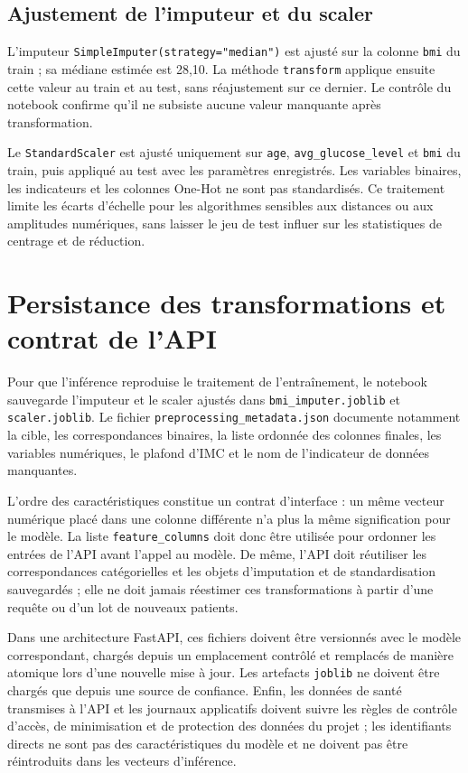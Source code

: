\subsection{Ajustement de l'imputeur et du scaler}
L'imputeur \texttt{SimpleImputer(strategy="median")} est ajusté sur la colonne \texttt{bmi} du train ; sa médiane estimée est 28,10. La méthode \texttt{transform} applique ensuite cette valeur au train et au test, sans réajustement sur ce dernier. Le contrôle du notebook confirme qu'il ne subsiste aucune valeur manquante après transformation.

Le \texttt{StandardScaler} est ajusté uniquement sur \texttt{age}, \texttt{avg\_glucose\_level} et \texttt{bmi} du train, puis appliqué au test avec les paramètres enregistrés. Les variables binaires, les indicateurs et les colonnes One-Hot ne sont pas standardisés. Ce traitement limite les écarts d'échelle pour les algorithmes sensibles aux distances ou aux amplitudes numériques, sans laisser le jeu de test influer sur les statistiques de centrage et de réduction.

\section{Persistance des transformations et contrat de l'API}
Pour que l'inférence reproduise le traitement de l'entraînement, le notebook sauvegarde l'imputeur et le scaler ajustés dans \texttt{bmi\_imputer.joblib} et \texttt{scaler.joblib}. Le fichier \texttt{preprocessing\_metadata.json} documente notamment la cible, les correspondances binaires, la liste ordonnée des colonnes finales, les variables numériques, le plafond d'IMC et le nom de l'indicateur de données manquantes.

L'ordre des caractéristiques constitue un contrat d'interface : un même vecteur numérique placé dans une colonne différente n'a plus la même signification pour le modèle. La liste \texttt{feature\_columns} doit donc être utilisée pour ordonner les entrées de l'API avant l'appel au modèle. De même, l'API doit réutiliser les correspondances catégorielles et les objets d'imputation et de standardisation sauvegardés ; elle ne doit jamais réestimer ces transformations à partir d'une requête ou d'un lot de nouveaux patients.

Dans une architecture FastAPI, ces fichiers doivent être versionnés avec le modèle correspondant, chargés depuis un emplacement contrôlé et remplacés de manière atomique lors d'une nouvelle mise à jour. Les artefacts \texttt{joblib} ne doivent être chargés que depuis une source de confiance. Enfin, les données de santé transmises à l'API et les journaux applicatifs doivent suivre les règles de contrôle d'accès, de minimisation et de protection des données du projet ; les identifiants directs ne sont pas des caractéristiques du modèle et ne doivent pas être réintroduits dans les vecteurs d'inférence.


